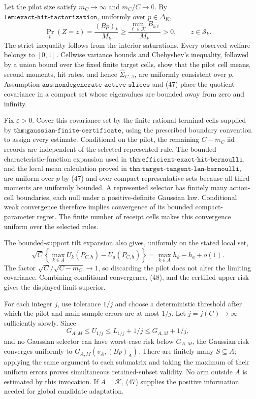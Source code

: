 Let the pilot size satisfy \(m_C\to\infty\) and \(m_C/C\to0\).  By \(\texttt{lem:exact-hit-factorization}\), uniformly over \(p\in\Delta_K\),
\[
\Pr_p(Z=z)=\frac{(Bp)_k}{M_k}
\geq\frac{\min_{\ell\in\mathcal K}B_{k\ell}}{M_k}>0,
\qquad z\in\mathcal S_k. \tag{47}
\]
The strict inequality follows from the interior saturations.  Every observed welfare belongs to \([0,1]\).  Cellwise variance bounds and Chebyshev's inequality, followed by a union bound over the fixed finite target cells, show that the pilot cell means, second moments, hit rates, and hence \(\widehat\Sigma_{C,A}\), are uniformly consistent over \(p\).  Assumption \(\texttt{ass:nondegenerate-active-slices}\) and (47) place the quotient covariance in a compact set whose eigenvalues are bounded away from zero and infinity.

Fix \(\varepsilon>0\).  Cover this covariance set by the finite rational terminal cells supplied by \(\texttt{thm:gaussian-finite-certificate}\), using the prescribed boundary convention to assign every estimate.  Conditional on the pilot, the remaining \(C-m_C\) iid records are independent of the selected represented rule.  The bounded characteristic-function expansion used in \(\texttt{thm:efficient-exact-hit-bernoulli}\), and the local mean calculation proved in \(\texttt{thm:target-tangent-lan-bernoulli}\), are uniform over \(p\) by (47) and over compact representative sets because all third moments are uniformly bounded.  A represented selector has finitely many action-cell boundaries, each null under a positive-definite Gaussian law.  Conditional weak convergence therefore implies convergence of its bounded compact-parameter regret.  The finite number of receipt cells makes this convergence uniform over the selected rules.

The bounded-support tilt expansion also gives, uniformly on the stated local set,
\[
\sqrt C\left\{\max_{k\in A}U_k(\bar P_{C,h})
-U_a(\bar P_{C,h})\right\}
=\max_{k\in A}h_k-h_a+o(1). \tag{48}
\]
The factor \(\sqrt C/\sqrt{C-m_C}\to1\), so discarding the pilot does not alter the limiting covariance.  Combining conditional convergence, (48), and the certified upper risk gives the displayed limit superior.

For each integer \(j\), use tolerance \(1/j\) and choose a deterministic threshold after which the pilot and main-sample errors are at most \(1/j\).  Let \(j=j(C)\to\infty\) sufficiently slowly.  Since
\[
G_{A,M}\leq U_{1/j}\leq L_{1/j}+1/j\leq G_{A,M}+1/j, \tag{49}
\]
and no Gaussian selector can have worst-case risk below \(G_{A,M}\), the Gaussian risk converges uniformly to \(G_{A,M}(v_A,(Bp)_A)\).  There are finitely many \(S\subseteq A\); applying the same argument to each submatrix and taking the maximum of their uniform errors proves simultaneous retained-subset validity.  No arm outside \(A\) is estimated by this invocation.  If \(A=\mathcal K\), (47) supplies the positive information needed for global candidate adaptation.